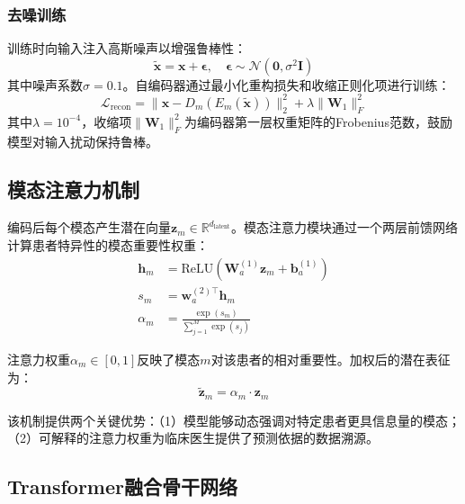 \documentclass[conference]{IEEEtran}
\begin{document}
\subsubsection{去噪训练}

训练时向输入注入高斯噪声以增强鲁棒性：
\begin{equation}
\tilde{\mathbf{x}} = \mathbf{x} + \boldsymbol{\epsilon}, \quad \boldsymbol{\epsilon} \sim \mathcal{N}(\mathbf{0}, \sigma^2 \mathbf{I})
\end{equation}
其中噪声系数$\sigma = 0.1$。自编码器通过最小化重构损失和收缩正则化项进行训练：
\begin{equation}
\mathcal{L}_{\text{recon}} = \|\mathbf{x} - D_m(E_m(\tilde{\mathbf{x}}))\|_2^2 + \lambda \|\mathbf{W}_1\|_F^2
\end{equation}
其中$\lambda = 10^{-4}$，收缩项$\|\mathbf{W}_1\|_F^2$为编码器第一层权重矩阵的Frobenius范数，鼓励模型对输入扰动保持鲁棒。

\subsection{模态注意力机制}
\label{sec:modality_attention}

编码后每个模态产生潜在向量$\mathbf{z}_m \in \mathbb{R}^{d_{\text{latent}}}$。模态注意力模块通过一个两层前馈网络计算患者特异性的模态重要性权重：
\begin{equation}
\begin{aligned}
\mathbf{h}_m &= \text{ReLU}(\mathbf{W}_a^{(1)} \mathbf{z}_m + \mathbf{b}_a^{(1)}) \\
s_m &= \mathbf{w}_a^{(2)\top} \mathbf{h}_m \\
\alpha_m &= \frac{\exp(s_m)}{\sum_{j=1}^{M} \exp(s_j)}
\end{aligned}
\end{equation}

注意力权重$\alpha_m \in [0, 1]$反映了模态$m$对该患者的相对重要性。加权后的潜在表征为：
\begin{equation}
\tilde{\mathbf{z}}_m = \alpha_m \cdot \mathbf{z}_m
\end{equation}

该机制提供两个关键优势：（1）模型能够动态强调对特定患者更具信息量的模态；（2）可解释的注意力权重为临床医生提供了预测依据的数据溯源。

\subsection{Transformer融合骨干网络}
\label{sec:transformer}
\end{document}
